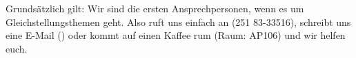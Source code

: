 \begin{multicols}{2}
Grundsätzlich gilt: Wir sind die ersten Ansprechpersonen, wenn es um Gleichstellungsthemen geht. Also ruft uns einfach an (251 83-33516), schreibt uns eine E-Mail (\textbf{}) oder kommt auf einen Kaffee rum (Raum: AP106) und wir helfen euch.


\end{multicols}

